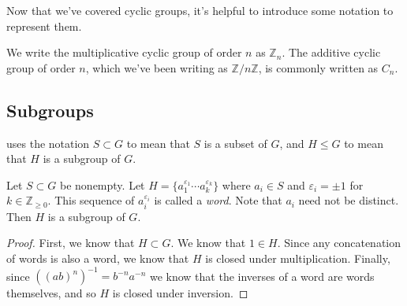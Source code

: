 Now that we've covered cyclic groups, it's helpful to introduce some notation to represent them.
\begin{notation}[$\mathbb{Z}_n, C_n$]
We write the multiplicative cyclic group of order $n$ as $\mathbb{Z}_n$. The additive cyclic group of order $n$, which we've been writing as $\mathbb{Z}/n\mathbb{Z}$, is commonly written as $C_n$.
\end{notation}

\subsection{Subgroups}

\cite{DF} uses the notation $S \subset G$ to mean that $S$ is a subset of $G$, and $H \leq G$ to mean that $H$ is a subgroup of $G$.

\begin{definition}[Subgroup]
Let $S \subset G$ be nonempty. Let $H = \{a_1^{\varepsilon_1}\cdots a_k^{\varepsilon_k}\}$ where $a_i \in S$ and $\varepsilon_i = \pm 1$ for $k \in \mathbb{Z}_{\geq 0}$. This sequence of $a_i^{\varepsilon_i}$ is called a \emph{word}. Note that $a_i$ need not be distinct. Then $H$ is a subgroup of $G$.
\end{definition}

\begin{proof}
First, we know that $H \subset G$. We know that $1 \in H$. Since any concatenation of words is also a word, we know that $H$ is closed under multiplication. Finally, since $((ab)^n)^{-1} = b^{-n}a^{-n}$ we know that the inverses of a word are words themselves, and so $H$ is closed under inversion.
\end{proof}